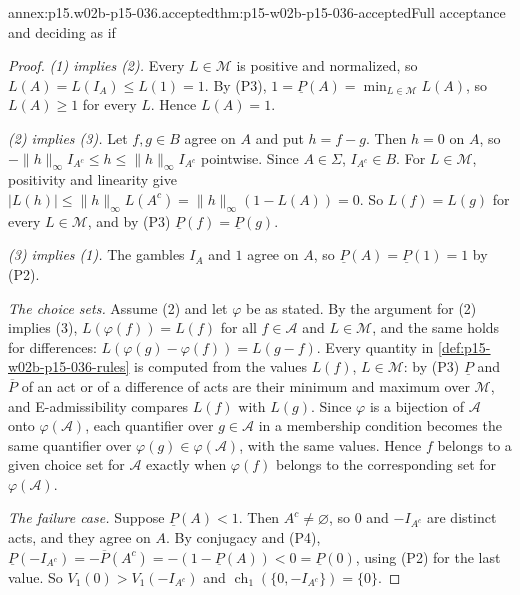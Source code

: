 \begin{annexitem}{annex:p15.w02b-p15-036.accepted}{thm:p15-w02b-p15-036-accepted}{Full acceptance and deciding as if}
\begin{proof}
\emph{(1) implies (2).} Every \(L\in\mathcal M\) is positive and
normalized, so \(L(A)=L(I_A)\leq L(1)=1\). By (P3),
\(1=\underline P(A)=\min_{L\in\mathcal M}L(A)\), so \(L(A)\geq1\) for every
\(L\). Hence \(L(A)=1\).

\emph{(2) implies (3).} Let \(f,g\in B\) agree on \(A\) and put
\(h=f-g\). Then \(h=0\) on \(A\), so
\(-\|h\|_\infty I_{A^c}\leq h\leq\|h\|_\infty I_{A^c}\) pointwise. Since
\(A\in\Sigma\), \(I_{A^c}\in B\). For \(L\in\mathcal M\), positivity and
linearity give \(|L(h)|\leq\|h\|_\infty L(A^c)=\|h\|_\infty(1-L(A))=0\).
So \(L(f)=L(g)\) for every \(L\in\mathcal M\), and by (P3)
\(\underline P(f)=\underline P(g)\).

\emph{(3) implies (1).} The gambles \(I_A\) and \(1\) agree on \(A\), so
\(\underline P(A)=\underline P(1)=1\) by (P2).

\emph{The choice sets.} Assume (2) and let \(\varphi\) be as stated. By the
argument for (2) implies (3), \(L(\varphi(f))=L(f)\) for all
\(f\in\mathcal A\) and \(L\in\mathcal M\), and the same holds for
differences: \(L(\varphi(g)-\varphi(f))=L(g-f)\). Every quantity in
\cref{def:p15-w02b-p15-036-rules} is computed from the values \(L(f)\),
\(L\in\mathcal M\): by (P3) \(\underline P\) and \(\overline P\) of an act
or of a difference of acts are their minimum and maximum over
\(\mathcal M\), and E-admissibility compares \(L(f)\) with \(L(g)\).
Since \(\varphi\) is a bijection of \(\mathcal A\) onto
\(\varphi(\mathcal A)\), each quantifier over \(g\in\mathcal A\) in a
membership condition becomes the same quantifier over
\(\varphi(g)\in\varphi(\mathcal A)\), with the same values. Hence
\(f\) belongs to a given choice set for \(\mathcal A\) exactly when
\(\varphi(f)\) belongs to the corresponding set for \(\varphi(\mathcal A)\).

\emph{The failure case.} Suppose \(\underline P(A)<1\). Then
\(A^c\ne\varnothing\), so \(0\) and \(-I_{A^c}\) are distinct acts, and
they agree on \(A\). By conjugacy and (P4),
\(\underline P(-I_{A^c})=-\overline P(A^c)=-(1-\underline P(A))<0
=\underline P(0)\), using (P2) for the last value. So
\(V_1(0)>V_1(-I_{A^c})\) and
\(\operatorname{ch}_1(\{0,-I_{A^c}\})=\{0\}\).
\end{proof}
\end{annexitem}

